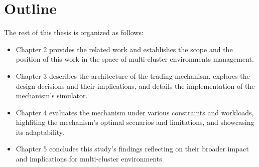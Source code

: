 \section{Outline}
The rest of this thesis is organized as follows:
\begin{itemize}
  
  \item Chapter 2 provides the related work and establishes the scope and the
    position of this work in the space of multi-cluster environments
    management.

  \item Chapter 3 describes the architecture of the trading mechanism, explores
    the design decisions and their implications, and details the implementation
    of the mechanism's simulator.  

  \item Chapter 4 evaluates the mechanism under various constraints and
    workloads, highliting the mechanism's optimal scenarios and limitations,
    and showcasing its adaptability.

  \item Chapter 5 concludes this study's findings reflecting on their broader
    impact and implications for multi-cluster environments.  

\end{itemize}
